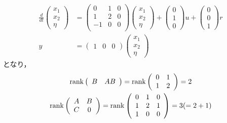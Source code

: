 \begin{align}
 \frac{d}{dt}
 \left(
 \begin{array}{c}
  x_1 \\
  x_2 \\
  \eta
 \end{array}
 \right) &=
 \left(
 \begin{array}{ccc}
  0 & 1 & 0 \\
  1 & 2 & 0 \\
  -1 & 0 & 0 \\
 \end{array}
 \right)
 \left(
 \begin{array}{c}
  x_1 \\
  x_2 \\
  \eta
 \end{array}
 \right) +
 \left(
 \begin{array}{c}
  0 \\
  1 \\
  0
 \end{array}
 \right) u +
 \left(
 \begin{array}{c}
  0 \\
  0 \\
  1
 \end{array}
 \right) r \\
 y &= 
 \left(
 \begin{array}{ccc}
  1 & 0 & 0
 \end{array}
 \right)
 \left(
 \begin{array}{c}
  x_1 \\
  x_2 \\
  \eta
 \end{array}
 \right)
\end{align}
となり，
\begin{gather}
 \mathop{\rm rank}\nolimits
 \left(
 \begin{array}{cc}
  B & AB
 \end{array}
 \right) =
 \mathop{\rm rank}\nolimits
 \left(
 \begin{array}{cc}
  0 & 1 \\
  1 & 2
 \end{array}
 \right) = 2 \\
 \mathop{\rm rank}\nolimits
 \left(
 \begin{array}{cc}
  A & B \\
  C & 0
 \end{array}
 \right) = 
 \mathop{\rm rank}\nolimits
 \left(
 \begin{array}{ccc}
  0 & 1 & 0 \\
  1 & 2 & 1 \\
  1 & 0 & 0
 \end{array}
 \right) = 
 3(= 2 + 1)
\end{gather}
